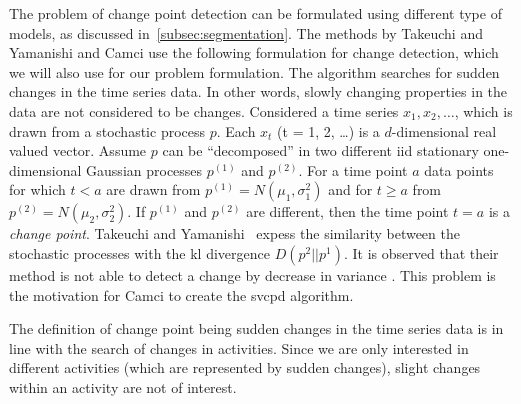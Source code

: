 The problem of change point detection can be formulated using different type of models, as discussed in~\ref{subsec:segmentation}.
The methods by Takeuchi and Yamanishi \cite{takeuchi2006unifying} and Camci \cite{camci2010change} use the following formulation for change detection, which we will also use for our problem formulation.
The algorithm searches for sudden changes in the time series data.
In other words, slowly changing properties in the data are not considered to be changes.
Considered a time series $x_1, x_2, \dots$, which is drawn from a stochastic process $p$.
Each $x_t$ (t = 1, 2, \dots) is a $d$-dimensional real valued vector.
Assume $p$ can be ``decomposed'' in two different \gls{iid} stationary one-dimensional Gaussian processes $p^{(1)}$ and $p^{(2)}$.
For a time point $a$ data points for which $t < a$ are drawn from $p^{(1)} = N(\mu_1, \sigma_1^2)$ and for $t \geq a$ from $p^{(2)} = N(\mu_2, \sigma_2^2)$.
If $p^{(1)}$ and $p^{(2)}$ are different, then the time point $t = a$ is a \emph{change point}.
Takeuchi and Yamanishi~\cite{takeuchi2006unifying} expess the similarity between the stochastic processes with the \gls{kl} divergence $D(p^2||p^1)$.
It is observed that their method is not able to detect a change by decrease in variance \cite{takeuchi2006unifying,camci2010change}.
This problem is the motivation for Camci \cite{camci2010change} to create the \gls{svcpd} algorithm.

The definition of change point being sudden changes in the time series data is in line with the search of changes in activities.
Since we are only interested in different activities (which are represented by sudden changes), slight changes within an activity are not of interest.




